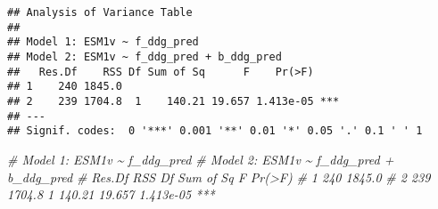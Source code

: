 \documentclass[
]{article}
\newenvironment{Shaded}{\begin{snugshade}}{\end{snugshade}}
\newcommand{\CommentTok}[1]{\textcolor[rgb]{0.56,0.35,0.01}{\textit{#1}}}
\begin{document}
\begin{verbatim}
## Analysis of Variance Table
## 
## Model 1: ESM1v ~ f_ddg_pred
## Model 2: ESM1v ~ f_ddg_pred + b_ddg_pred
##   Res.Df    RSS Df Sum of Sq      F    Pr(>F)    
## 1    240 1845.0                                  
## 2    239 1704.8  1    140.21 19.657 1.413e-05 ***
## ---
## Signif. codes:  0 '***' 0.001 '**' 0.01 '*' 0.05 '.' 0.1 ' ' 1
\end{verbatim}

\begin{Shaded}
\begin{Highlighting}[]
\CommentTok{\# Model 1: ESM1v \textasciitilde{} f\_ddg\_pred}
\CommentTok{\# Model 2: ESM1v \textasciitilde{} f\_ddg\_pred + b\_ddg\_pred}
\CommentTok{\#   Res.Df    RSS Df Sum of Sq      F    Pr(\textgreater{}F)    }
\CommentTok{\# 1    240 1845.0                                  }
\CommentTok{\# 2    239 1704.8  1    140.21 19.657 1.413e{-}05 ***}
\end{Highlighting}
\end{Shaded}
\end{document}
